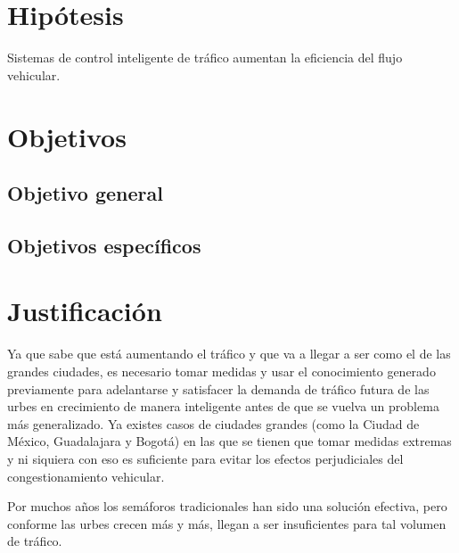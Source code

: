 \hypertarget{hipuxf3tesis}{%
\section{Hipótesis}\label{hipuxf3tesis}}

Sistemas de control inteligente de tráfico aumentan la eficiencia del
flujo vehicular.

\hypertarget{objetivos}{%
\section{Objetivos}\label{objetivos}}

\hypertarget{objetivo-general}{%
\subsection{Objetivo general}\label{objetivo-general}}

\hypertarget{objetivos-especuxedficos}{%
\subsection{Objetivos específicos}\label{objetivos-especuxedficos}}

\hypertarget{justificaciuxf3n}{%
\section{Justificación}\label{justificaciuxf3n}}

Ya que sabe que está aumentando el tráfico y que va a llegar a ser como
el de las grandes ciudades, es necesario tomar medidas y usar el
conocimiento generado previamente para adelantarse y satisfacer la
demanda de tráfico futura de las urbes en crecimiento de manera
inteligente antes de que se vuelva un problema más generalizado. Ya
existes casos de ciudades grandes (como la Ciudad de México, Guadalajara
y Bogotá) en las que se tienen que tomar medidas extremas y ni siquiera
con eso es suficiente para evitar los efectos perjudiciales del
congestionamiento vehicular.

Por muchos años los semáforos tradicionales han sido una solución
efectiva, pero conforme las urbes crecen más y más, llegan a ser
insuficientes para tal volumen de tráfico.

\clearpage %
